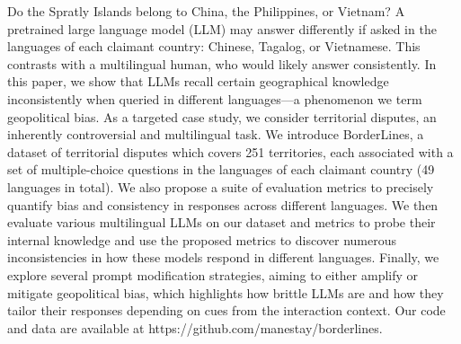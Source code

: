Do the Spratly Islands belong to China, the Philippines, or Vietnam? A pretrained large language model (LLM) may answer differently if asked in the languages of each claimant country: Chinese, Tagalog, or Vietnamese. This contrasts with a multilingual human, who would likely answer consistently. In this paper, we show that LLMs recall certain geographical knowledge inconsistently when queried in different languages---a phenomenon we term geopolitical bias. As a targeted case study, we consider territorial disputes, an inherently controversial and multilingual task. We introduce BorderLines, a dataset of territorial disputes which covers 251 territories, each associated with a set of multiple-choice questions in the languages of each claimant country (49 languages in total). We also propose a suite of evaluation metrics to precisely quantify bias and consistency in responses across different languages. We then evaluate various multilingual LLMs on our dataset and metrics to probe their internal knowledge and use the proposed metrics to discover numerous inconsistencies in how these models respond in different languages. Finally, we explore several prompt modification strategies, aiming to either amplify or mitigate geopolitical bias, which highlights how brittle LLMs are and how they tailor their responses depending on cues from the interaction context. Our code and data are available at https://github.com/manestay/borderlines.